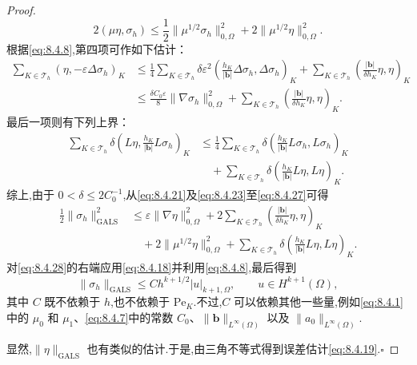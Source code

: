 \begin{proof}
\begin{equation}
  2(\mu\eta,\sigma_h)\le\frac12\|\mu^{1/2}\sigma_h\|_{0,\Omega}^2
                         +2\|\mu^{1/2}\eta\|_{0,\Omega}^2.
\end{equation}
根据\eqref{eq:8.4.8},第四项可作如下估计：
\begin{equation}\label{eq:8.4.26}
  \begin{aligned}
    \sum_{K\in\mathcal T_h}(\eta,-\varepsilon\Delta\sigma_h)_K
      &\le\frac14\sum_{K\in\mathcal T_h}\delta\varepsilon^2
            \left(\frac{h_K}{|\boldsymbol{b}|}\Delta\sigma_h,\Delta\sigma_h\right)_K
        +\sum_{K\in\mathcal T_h}\left(\frac{|\boldsymbol{b}|}{\delta h_K}\eta,\eta\right)_K\\
      &\le\frac{\delta C_0\varepsilon}{8}\|\nabla\sigma_h\|_{0,\Omega}^2
        +\sum_{K\in\mathcal T_h}\left(\frac{|\boldsymbol{b}|}{\delta h_K}\eta,\eta\right)_K.
  \end{aligned}
\end{equation}
最后一项则有下列上界：
\begin{equation}\label{eq:8.4.27}
  \begin{aligned}
    \sum_{K\in\mathcal T_h}\delta\left(L\eta,\frac{h_K}{|\boldsymbol{b}|}L\sigma_h\right)_K
      &\le\frac14\sum_{K\in\mathcal T_h}\delta
               \left(\frac{h_K}{|\boldsymbol{b}|}L\sigma_h,L\sigma_h\right)_K\\
      &\quad+\sum_{K\in\mathcal T_h}\delta\left(\frac{h_K}{|\boldsymbol{b}|}L\eta,L\eta\right)_K.
  \end{aligned}
\end{equation}
综上,由于 \(0<\delta\le2C_0^{-1}\),从\eqref{eq:8.4.21}及\eqref{eq:8.4.23}至\eqref{eq:8.4.27}可得
\begin{equation}\label{eq:8.4.28}
  \begin{aligned}
    \frac12\|\sigma_h\|_{\mathrm{GALS}}^2
      &\le\varepsilon\|\nabla\eta\|_{0,\Omega}^2
          +2\sum_{K\in\mathcal T_h}\left(\frac{|\boldsymbol{b}|}{\delta h_K}\eta,\eta\right)_K\\
      &\quad+2\|\mu^{1/2}\eta\|_{0,\Omega}^2
          +\sum_{K\in\mathcal T_h}\delta\left(\frac{h_K}{|\boldsymbol{b}|}L\eta,L\eta\right)_K.
  \end{aligned}
\end{equation}
对\eqref{eq:8.4.28}的右端应用\eqref{eq:8.4.18}并利用\eqref{eq:8.4.8},最后得到
\begin{equation}\label{eq:8.4.29}
  \|\sigma_h\|_{\mathrm{GALS}}\le Ch^{k+1/2}|u|_{k+1,\Omega},\qquad u\in H^{k+1}(\Omega),
\end{equation}
其中 \(C\) 既不依赖于 \(h\),也不依赖于 \(\mathrm{Pe}_K\).不过,\(C\) 可以依赖其他一些量,例如\eqref{eq:8.4.1}中的 \(\mu_0\) 和 \(\mu_1\)、\eqref{eq:8.4.7}中的常数 \(C_0\)、\(\|\boldsymbol{b}\|_{L^\infty(\Omega)}\) 以及 \(\|a_0\|_{L^\infty(\Omega)}\).

显然,\(\|\eta\|_{\mathrm{GALS}}\) 也有类似的估计.于是,由三角不等式得到误差估计\eqref{eq:8.4.19}.\hfill\(\square\)
\end{proof}

